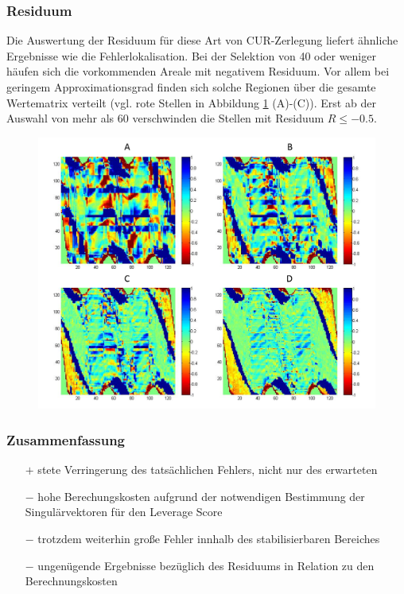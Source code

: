 \documentclass[12pt,a4paper,twoside]{article}
\begin{document}
	\subsubsection*{Residuum}
		Die Auswertung der Residuum für diese Art von CUR-Zerlegung liefert ähnliche Ergebnisse wie die Fehlerlokalisation. Bei der Selektion von 40 oder weniger häufen sich die vorkommenden Areale mit negativem Residuum. Vor allem bei geringem Approximationsgrad finden sich solche Regionen über die gesamte Wertematrix verteilt (vgl. rote Stellen in Abbildung \ref{pic:CUR_res} (A)-(C)).
		Erst ab der Auswahl von mehr als 60 verschwinden die Stellen mit Residuum $R\leq -0.5$. 
		\newpage
\begin{figure}[h]
		\center
		\includegraphics[scale=0.5]{CUR_residuum}
		\caption{\label{pic:CUR_res}}
		\end{figure}
	\subsubsection*{Zusammenfassung}
	\begin{itemize}
	\item[$+$] stete Verringerung des tatsächlichen Fehlers, nicht nur des erwarteten
	\item[$-$] hohe Berechungskosten aufgrund der notwendigen Bestimmung der Singulärvektoren für den Leverage Score
	\item[$-$] trotzdem weiterhin große Fehler innhalb des stabilisierbaren Bereiches
	\item[$-$] ungenügende Ergebnisse bezüglich des Residuums in Relation zu den Berechnungskosten
	\end{itemize}
\newpage
\end{document}
